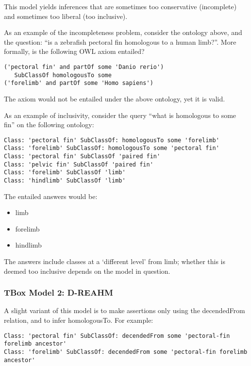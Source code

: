 This model yields inferences that are sometimes too conservative
(incomplete) and sometimes too liberal (too inclusive).

As an example of the incompleteness problem, consider the ontology
above, and the question: ``is a zebrafish pectoral fin homologous to a
human limb?''. More formally, is the following OWL axiom entailed?

\begin{verbatim}
('pectoral fin' and partOf some 'Danio rerio')
   SubClassOf homologousTo some
('forelimb' and partOf some 'Homo sapiens') 
\end{verbatim}

The axiom would not be entailed under the above ontology, yet it is
valid.

As an example of inclusivity, consider the query ``what is homologous to
some fin'' on the following ontology:

\begin{verbatim}
Class: 'pectoral fin' SubClassOf: homologousTo some 'forelimb'
Class: 'forelimb' SubClassOf: homologousTo some 'pectoral fin'
Class: 'pectoral fin' SubClassOf 'paired fin'
Class: 'pelvic fin' SubClassOf 'paired fin'
Class: 'forelimb' SubClassOf 'limb'
Class: 'hindlimb' SubClassOf 'limb'
\end{verbatim}

The entailed answers would be:

\begin{itemize}
\itemsep1pt\parskip0pt
\item
  limb
\item
  forelimb
\item
  hindlimb
\end{itemize}

The answers include classes at a `different level' from limb; whether
this is deemed too inclusive depends on the model in question.

\subsubsection{TBox Model 2: D-REAHM}\label{tbox-model-2-d-reahm}

A slight variant of this model is to make assertions only using the
decendedFrom relation, and to infer homologousTo. For example:

\begin{verbatim}
Class: 'pectoral fin' SubClassOf: decendedFrom some 'pectoral-fin forelimb ancestor'
Class: 'forelimb' SubClassOf: decendedFrom some 'pectoral-fin forelimb ancestor'
\end{verbatim}

